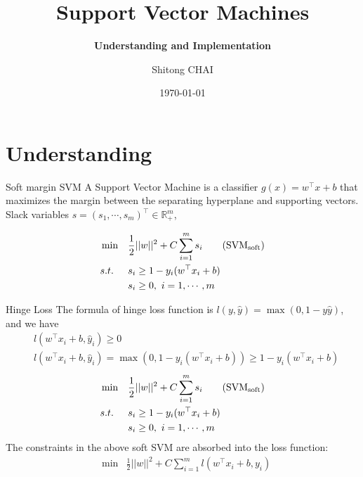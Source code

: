\documentclass[10pt,aspectratio=43,mathserif]{beamer}
\title{Support Vector Machines}
\subtitle{\fontsize{9pt}{14pt}\textbf{Understanding and Implementation}}
\author{Shitong CHAI}
\institute{ISIMA}
\date{\today}
\begin{document}
\frame{\titlepage}

\section{Understanding}
\begin{frame}{Soft margin SVM}
A Support Vector Machine is a classifier $g(x)= w^\top x + b $ that maximizes the margin between the separating hyperplane and supporting vectors. Slack variables $ s=(s_1,\cdots,s_m)^\top\in\mathbb R_+^m $, 

\begin{align*}
    &\min & & \frac{1}{2} ||w||^2 + C\sum_{i=1}^m s_i \label{svmsoft}\tag{$\mathrm{SVM_{soft}}$} \\
    &s.t. & & s_i  \geq 1 - y_i(w^\top x_i +b)\\
    &     & & s_i \geq 0, \ i=1,\cdots,m
\end{align*}
\end{frame}
\begin{frame}{Hinge Loss}
The formula of hinge loss function is $l(y,\hat y)=\max(0,1-y\hat y)$, and we have
\begin{align}
    &l(w^\top x_i+b,\hat y_i) \geq 0 \\
    &l(w^\top x_i+b,\hat y_i) =\max(0,1-y_i(w^\top x_i+b))\geq 1-y_i(w^\top x_i+b)
\end{align}
\begin{align*}
    &\min & & \frac{1}{2} ||w||^2 + C\sum_{i=1}^m s_i \label{svmsoft}\tag{$\mathrm{SVM_{soft}}$} \\
    &s.t. & & s_i  \geq 1 - y_i(w^\top x_i +b)\\
    &     & & s_i \geq 0, \ i=1,\cdots,m
\end{align*}
The constraints in the above soft SVM are absorbed into the loss function:
\begin{align*}
    &\min & \frac{1}{2}||w||^2 + C \sum_{i=1}^m l(w^\top x_i+b, y_i)
\end{align*}
\end{frame}
\end{document}
